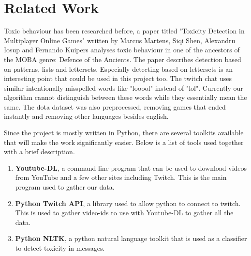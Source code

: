 \documentclass[final]{report}
\begin{document}
\chapter{Related Work}
\label{ch:relatedwork}

Toxic behaviour has been researched before, a paper titled "Toxicity Detection in Multiplayer Online Games" written by Marcus Martens, Siqi Shen, Alexandru Iosup and Fernando Kuipers analyses toxic behaviour in one of the ancestors of the MOBA genre: Defence of the Ancients. The paper describes detection based on patterns, lists and lettersets. Especially detecting based on lettersets is an interesting point that could be used in this project too. The twitch chat uses similar intentionally misspelled words like "looool" instead of "lol". Currently our algorithm cannot distinguish between these words while they essentially mean the same. The dota dataset was also preprocessed, removing games that ended instantly and removing other languages besides english.

Since the project is mostly written in Python, there are several toolkits available that will make the work significantly easier. Below is a list of tools used together with a brief description.

\begin{enumerate}
	\item \textbf{Youtube-DL}, a command line program that can be used to download videos from YouTube and a few other sites including Twitch. This is the main program used to gather our data. 
	\item \textbf{Python Twitch API}, a library used to allow python to connect to twitch. This is used to gather video-ids to use with Youtube-DL to gather all the data.
	\item \textbf{Python NLTK}, a python natural language toolkit that is used as a classifier to detect toxicity in messages.
\end{enumerate}
\end{document}
